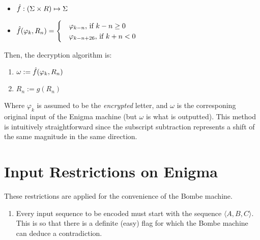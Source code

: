 \documentclass[12pt,a4paper]{article}
\begin{document}
	 \begin{itemize}
		\item $\hat{f}: (\Sigma \times R) \mapsto \Sigma$ 
		\item $\hat{f}(\varphi_k, R_n)= 					
					\begin{cases} 
						&\varphi_{k-n} \text{, if } {k-n} \geq 0 \\
						&\varphi_{k-n+26} \text{, if }{k+n} < 0
					\end{cases}
			  $ 
	\end{itemize}

	Then, the decryption algorithm is:
	

	\begin{enumerate}
		\item $\omega := \hat{f}(\varphi_k, R_n)$
		\item $R_n := g(R_n)$
	\end{enumerate}

	Where $\varphi_k$ is assumed to be the \emph{encrypted} letter, and $\omega$ is the corresponing original input of the Enigma machine (but $\omega$ is what is outputted). This method is intuitively straightforward since the subscript subtraction represents a shift of the same magnitude in the same direction. \\

	

	\section{Input Restrictions on Enigma}
	These restrictions are applied for the convenience of the Bombe machine.

	\begin{enumerate}
		\item Every input sequence to be encoded must start with the sequence $\langle A, B, C \rangle$.
		This is so that there is a definite (easy) flag for which the Bombe machine can deduce a contradiction.
	\end{enumerate}
\end{document}
